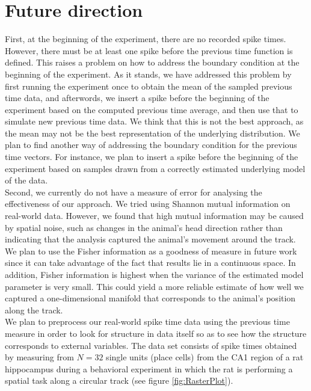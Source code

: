 \section{Future direction}
First, at the beginning of the experiment, there are no recorded spike times. However, there must be at least one spike before  the previous time function is defined. This raises a problem on how to address the boundary condition at the beginning of the experiment. As it stands, we have addressed this problem by first running the experiment once to obtain the mean of the sampled previous time data, and afterwords, we insert a spike before the beginning of the experiment based on the computed previous time average, and then use that to simulate new  previous time data. We think that this is not the best approach, as the mean may not be the best representation of the underlying distribution. We plan to find another way of addressing the boundary condition for the previous time vectors. For instance, we plan to insert a spike before the beginning of the experiment based on samples drawn from a correctly estimated underlying model of the data.\\

Second, we currently do not have a measure of error for analysing the  effectiveness of our approach. 
We tried using Shannon mutual information on real-world data. However, we found that  high  mutual information may be caused by spatial noise, such as changes in the animal's head direction rather than indicating that the analysis captured the animal's movement around the track.  We plan to use the Fisher information as a goodness of measure in future work since it can take advantage of the fact that results lie in a continuous space. In addition, Fisher information is highest when  the variance of the estimated model parameter is very small. This could  yield a more reliable estimate of
how well we captured a one-dimensional manifold that corresponds to the animal's position along the track. \\

We plan to preprocess  our real-world spike time  data  using the previous time measure  in order to look for
structure in data itself so as to see how the structure corresponds to external variables. The  data set consists of spike times
obtained by measuring from $N = 32$ single units (place cells)  from the CA1 region of a rat hippocampus during a behavioral experiment in which the rat is performing a spatial task along a circular track (see figure \ref{fig:RasterPlot}).\\

